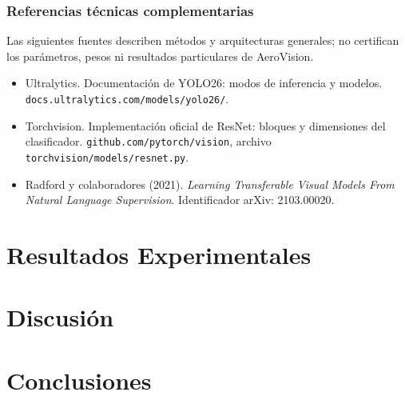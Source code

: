 \documentclass[12pt,letterpaper]{article}
\begin{document}
\subsubsection{Referencias técnicas complementarias}

Las siguientes fuentes describen métodos y arquitecturas generales; no certifican los parámetros, pesos ni resultados particulares de AeroVision.

\begin{itemize}

\item Ultralytics. Documentación de YOLO26: modos de inferencia y modelos. \texttt{docs.ultralytics.com/models/yolo26/}.

\item Torchvision. Implementación oficial de ResNet: bloques y dimensiones del clasificador. \texttt{github.com/pytorch/vision}, archivo \texttt{torchvision/models/resnet.py}.

\item Radford y colaboradores (2021). \textit{Learning Transferable Visual Models From Natural Language Supervision}. Identificador arXiv: 2103.00020.

\end{itemize}



\section{Resultados Experimentales}


\section{Discusión}


\section{Conclusiones}

\end{document}
